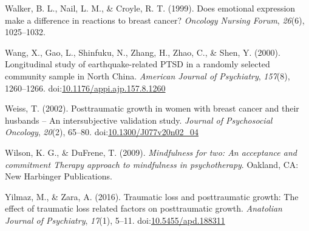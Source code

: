 \documentclass[english,man]{apa6}
\theoremstyle{definition}
\theoremstyle{definition}
\theoremstyle{definition}
\theoremstyle{remark}
\begin{document}
\hypertarget{ref-Walker1999a}{}
Walker, B. L., Nail, L. M., \& Croyle, R. T. (1999). Does emotional
expression make a difference in reactions to breast cancer?
\emph{Oncology Nursing Forum}, \emph{26}(6), 1025--1032.

\hypertarget{ref-Wang2000}{}
Wang, X., Gao, L., Shinfuku, N., Zhang, H., Zhao, C., \& Shen, Y.
(2000). Longitudinal study of earthquake-related PTSD in a randomly
selected community sample in North China. \emph{American Journal of
Psychiatry}, \emph{157}(8), 1260--1266.
doi:\href{https://doi.org/10.1176/appi.ajp.157.8.1260}{10.1176/appi.ajp.157.8.1260}

\hypertarget{ref-Weiss2002}{}
Weiss, T. (2002). Posttraumatic growth in women with breast cancer and
their husbands -- An intersubjective validation study. \emph{Journal of
Psychosocial Oncology}, \emph{20}(2), 65--80.
doi:\href{https://doi.org/10.1300/J077v20n02_04}{10.1300/J077v20n02\_04}

\hypertarget{ref-Wilson2009}{}
Wilson, K. G., \& DuFrene, T. (2009). \emph{Mindfulness for two: An
acceptance and commitment Therapy approach to mindfulness in
psychotherapy}. Oakland, CA: New Harbinger Publications.

\hypertarget{ref-Yilmaz2016}{}
Yilmaz, M., \& Zara, A. (2016). Traumatic loss and posttraumatic growth:
The effect of traumatic loss related factors on posttraumatic growth.
\emph{Anatolian Journal of Psychiatry}, \emph{17}(1), 5--11.
doi:\href{https://doi.org/10.5455/apd.188311}{10.5455/apd.188311}
\end{document}
